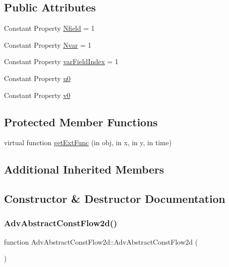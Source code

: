 \subsection*{Public Attributes}
\begin{DoxyCompactItemize}
\item 
Constant Property \hyperlink{class_adv_abstract_const_flow2d_a539dfdd6f9703f75a49412e1c6744437}{Nfield} = 1
\item 
Constant Property \hyperlink{class_adv_abstract_const_flow2d_a91def3e5d75810d1012a3eeac262bc51}{Nvar} = 1
\item 
Constant Property \hyperlink{class_adv_abstract_const_flow2d_a5feb8ff323774cb946fc0de2b38e52c3}{var\+Field\+Index} = 1
\item 
Constant Property \hyperlink{class_adv_abstract_const_flow2d_a2b2a3f74ded0dfa6fea5473923e5b969}{u0}
\item 
Constant Property \hyperlink{class_adv_abstract_const_flow2d_a26ac547ef6cd8a164bc5bfa4a5f9e1e3}{v0}
\end{DoxyCompactItemize}
\subsection*{Protected Member Functions}
\begin{DoxyCompactItemize}
\item 
virtual function \hyperlink{class_adv_abstract_const_flow2d_abb97135788cf292036aecacf1837e138}{get\+Ext\+Func} (in obj, in x, in y, in time)
\end{DoxyCompactItemize}
\subsection*{Additional Inherited Members}


\subsection{Constructor \& Destructor Documentation}
\mbox{\label{class_adv_abstract_const_flow2d_ac2319f003698c8cb0b1aad7042e4ef32}} 
\subsubsection{\texorpdfstring{Adv\+Abstract\+Const\+Flow2d()}{AdvAbstractConstFlow2d()}}
{\footnotesize\ttfamily function Adv\+Abstract\+Const\+Flow2d\+::\+Adv\+Abstract\+Const\+Flow2d (\begin{DoxyParamCaption}{ }\end{DoxyParamCaption})}



